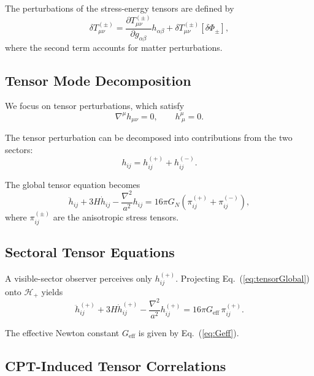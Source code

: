 \documentclass[11pt,a4paper]{article}
\begin{document}
The perturbations of the stress-energy tensors are defined by
\begin{equation}
\delta T_{\mu\nu}^{(\pm)} = 
\frac{\partial T_{\mu\nu}^{(\pm)}}{\partial g_{\alpha\beta}} h_{\alpha\beta}
+ \delta T_{\mu\nu}^{(\pm)}[\delta \Phi_\pm],
\end{equation}
where the second term accounts for matter perturbations.

\subsection{Tensor Mode Decomposition}

We focus on tensor perturbations, which satisfy
\begin{equation}
\nabla^\mu h_{\mu\nu} = 0, \qquad h^\mu_{\ \mu} = 0.
\end{equation}

The tensor perturbation can be decomposed into contributions from the two sectors:
\begin{equation}
h_{ij} = h_{ij}^{(+)} + h_{ij}^{(-)}.
\end{equation}

The global tensor equation becomes
\begin{equation}
\ddot{h}_{ij} + 3H \dot{h}_{ij} - \frac{\nabla^2}{a^2} h_{ij}
= 16\pi G_N \left( \pi_{ij}^{(+)} + \pi_{ij}^{(-)} \right),
\label{eq:tensorGlobal}
\end{equation}
where $\pi_{ij}^{(\pm)}$ are the anisotropic stress tensors.

\subsection{Sectoral Tensor Equations}

A visible-sector observer perceives only $h_{ij}^{(+)}$. Projecting Eq.~(\ref{eq:tensorGlobal}) onto $\mathcal{H}_+$ yields
\begin{equation}
\ddot{h}_{ij}^{(+)} + 3H \dot{h}_{ij}^{(+)} - \frac{\nabla^2}{a^2} h_{ij}^{(+)}
= 16\pi G_{\mathrm{eff}} \, \pi_{ij}^{(+)}.
\label{eq:tensorSector}
\end{equation}

The effective Newton constant $G_{\mathrm{eff}}$ is given by Eq.~(\ref{eq:Geff}).

\subsection{CPT-Induced Tensor Correlations}
\end{document}
